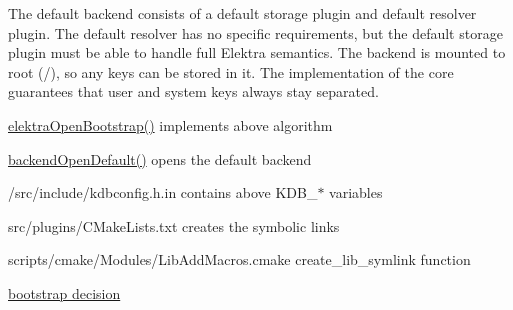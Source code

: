 The default backend consists of a default storage plugin and default resolver plugin. The default resolver has no specific requirements, but the default storage plugin must be able to handle full Elektra semantics. The backend is mounted to root ({\ttfamily /}), so any keys can be stored in it. The implementation of the core guarantees that user and system keys always stay separated.


\begin{DoxyItemize}
\item {\ttfamily \hyperlink{group__kdb_ga5bfaad0230457cd6386032fe65c41576}{elektra\+Open\+Bootstrap()}} implements above algorithm
\item {\ttfamily \hyperlink{backend_8c_a5227608d302910f25fc3a5c8968ab542}{backend\+Open\+Default()}} opens the default backend
\item {\ttfamily /src/include/kdbconfig.h.\+in} contains above {\ttfamily K\+D\+B\+\_\+$\ast$} variables
\item {\ttfamily src/plugins/\+C\+Make\+Lists.\+txt} creates the symbolic links
\item {\ttfamily scripts/cmake/\+Modules/\+Lib\+Add\+Macros.\+cmake} {\ttfamily create\+\_\+lib\+\_\+symlink} function
\end{DoxyItemize}


\begin{DoxyItemize}
\item \hyperlink{doc_decisions_bootstrap_md}{bootstrap decision} 
\end{DoxyItemize}
